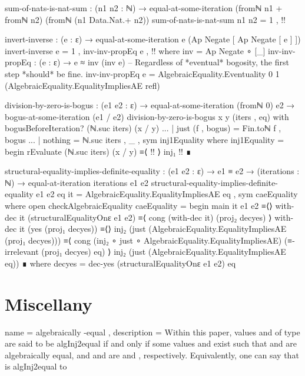\documentclass{report}
\begin{document}
\begin{code}
  sum-of-nats-is-nat-sum :
    (n1 n2 : ℕ) →
    equal-at-some-iteration (fromℕ n1 + fromℕ n2) (fromℕ (n1 Data.Nat.+ n2))
  sum-of-nats-is-nat-sum n1 n2 = 1 , {!!}

  invert-inverse : (e : ε) → equal-at-some-iteration e (Ap Negate [ Ap Negate [ e ] ])
  invert-inverse e = 1 , inv-inv-propEq e , {!!}
    where
    inv = Ap Negate ∘ [_]
    inv-inv-propEq :
      (e : ε) →
      e ≈ inv (inv e)
    -- Regardless of *eventual* bogosity, the first step *should* be fine.
    inv-inv-propEq e =
      AlgebraicEquality.Eventuality 0 1 (AlgebraicEquality.EqualityImpliesAE refl)

  division-by-zero-is-bogus :
    (e1 e2 : ε) →
    equal-at-some-iteration (fromℕ 0) e2 →
    bogus-at-some-iteration (e1 / e2)
  division-by-zero-is-bogus x y (iters , eq) with bogusBeforeIteration? (ℕ.suc iters) (x / y)
  ... | just (f , bogus) = Fin.toℕ f , bogus
  ... | nothing = ℕ.suc iters , _ , sym inj1Equality
    where
    inj1Equality = begin
      rEvaluate (ℕ.suc iters) (x / y)
        ≡⟨ {!!} ⟩
      inj₁ {!!} ∎

  structural-equality-implies-definite-equality :
    (e1 e2 : ε) →
    e1 ≡ e2 →
    (iterations : ℕ) →
    equal-at-iteration iterations e1 e2
  structural-equality-implies-definite-equality e1 e2 eq it =
    AlgebraicEquality.EqualityImpliesAE eq , sym caeEquality
    where
    open checkAlgebraicEquality
    caeEquality = begin
      main it e1 e2
        ≡⟨⟩
      with-dec it (structuralEqualityOnε e1 e2)
        ≡⟨ cong (with-dec it) (proj₂ decyes) ⟩
      with-dec it (yes (proj₁ decyes))
        ≡⟨⟩
      inj₂ (just (AlgebraicEquality.EqualityImpliesAE (proj₁ decyes)))
        ≡⟨ cong (inj₂ ∘ just ∘ AlgebraicEquality.EqualityImpliesAE)
                (≡-irrelevant (proj₁ decyes) eq) ⟩
      inj₂ (just (AlgebraicEquality.EqualityImpliesAE eq)) ∎
      where
      decyes = dec-yes (structuralEqualityOnε e1 e2) eq
\end{code}

\part{Miscellany}

  { name = algebraically -equal
  , description = {Within this paper, values  and  of type    are said to be \gls{algInj2equal} if and only if some values  and  exist such that  and  are algebraically equal, and  and  are   and  , respectively.  Equivalently, one can say that  is \gls{algInj2equal} to }
  }
\end{document}
